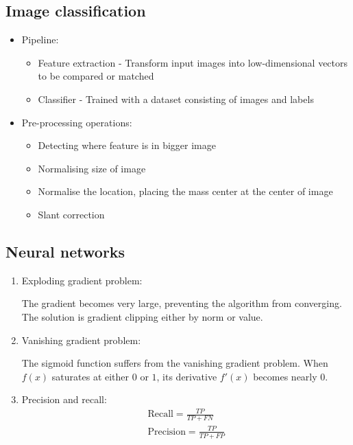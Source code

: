 \documentclass[9pt]{article}
\begin{document}
\begin{multicols*}{2}
    \subsection{Image classification}
    \begin{itemize}
        \item Pipeline:
        \begin{itemize}
            \item Feature extraction - Transform input images into low-dimensional vectors to be compared or matched 
            \item Classifier - Trained with a dataset consisting of images and labels 
        \end{itemize}

        \item Pre-processing operations:
        \begin{itemize}
            \item Detecting where feature is in bigger image 
            \item Normalising size of image 
            \item Normalise the location, placing the mass center at the center of image 
            \item Slant correction 
        \end{itemize}
    \end{itemize}

    \subsection{Neural networks}
    \begin{enumerate}
        \item Exploding gradient problem:
        
        The gradient becomes very large, preventing the algorithm from converging. The solution is gradient clipping either by norm or value.


        \item Vanishing gradient problem:
        
        The sigmoid function suffers from the vanishing gradient problem. When $f(x)$ saturates at either $0$ or $1$, its derivative $f'(x)$ becomes nearly $0$.

        \item Precision and recall:
        \begin{gather*}
            \text{Recall} = \frac{TP}{TP + FN} \\ 
            \text{Precision} = \frac{TP}{TP + FP} 
        \end{gather*}


\end{enumerate}
\end{multicols*}
\end{document}
